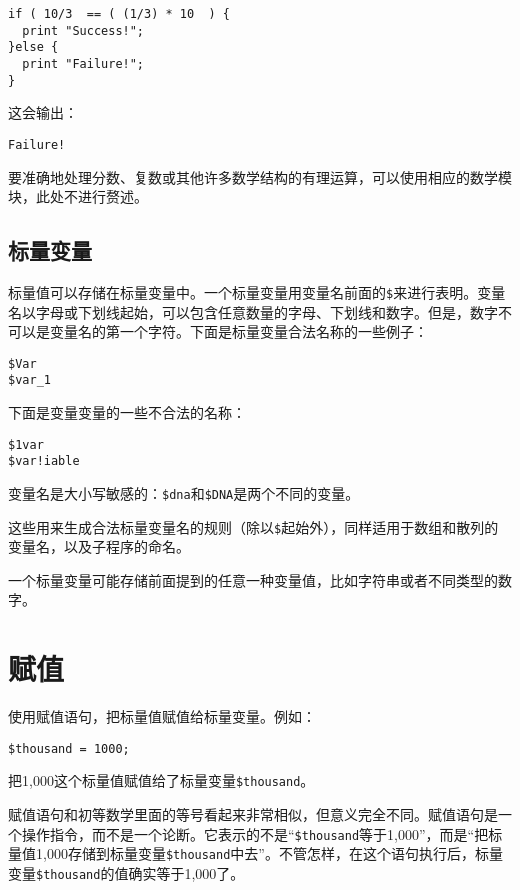 \begin{lstlisting}
if ( 10/3  == ( (1/3) * 10  ) {
  print "Success!";
}else {
  print "Failure!";
}
\end{lstlisting}

这会输出：

\begin{lstlisting}
Failure!
\end{lstlisting}

要准确地处理分数、复数或其他许多数学结构的有理运算，可以使用相应的数学模块，此处不进行赘述。

\subsection{标量变量}
标量值可以存储在标量变量中。一个标量变量用变量名前面的\verb|$|来进行表明。变量名以字母或下划线起始，可以包含任意数量的字母、下划线和数字。但是，数字不可以是变量名的第一个字符。下面是标量变量合法名称的一些例子：

\begin{lstlisting}
$Var
$var_1
\end{lstlisting}

下面是变量变量的一些不合法的名称：

\begin{lstlisting}
$1var
$var!iable
\end{lstlisting}

变量名是大小写敏感的：\verb|$dna|和\verb|$DNA|是两个不同的变量。

这些用来生成合法标量变量名的规则（除以\verb|$|起始外），同样适用于数组和散列的变量名，以及子程序的命名。

一个标量变量可能存储前面提到的任意一种变量值，比如字符串或者不同类型的数字。

\section{赋值}
使用赋值语句，把标量值赋值给标量变量。例如：

\begin{lstlisting}
$thousand = 1000;
\end{lstlisting}

把1,000这个标量值赋值给了标量变量\verb|$thousand|。

赋值语句和初等数学里面的等号看起来非常相似，但意义完全不同。赋值语句是一个操作指令，而不是一个论断。它表示的不是“\verb|$thousand|等于1,000”，而是“把标量值1,000存储到标量变量\verb|$thousand|中去”。不管怎样，在这个语句执行后，标量变量\verb|$thousand|的值确实等于1,000了。


